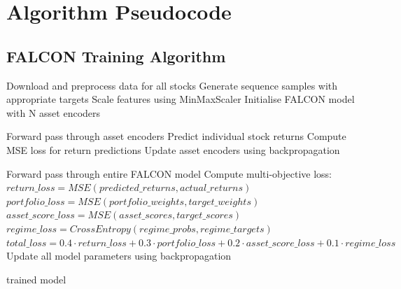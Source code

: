 \documentclass[conference]{IEEEtran}
\begin{document}
\section{Algorithm Pseudocode}

\subsection{FALCON Training Algorithm}
\begin{algorithmic}[1]
\State Download and preprocess data for all stocks
\State Generate sequence samples with appropriate targets
\State Scale features using MinMaxScaler
\State Initialise FALCON model with N asset encoders

        \State Forward pass through asset encoders
        \State Predict individual stock returns
        \State Compute MSE loss for return predictions
        \State Update asset encoders using backpropagation
    \EndFor
\EndFor

        \State Forward pass through entire FALCON model
        \State Compute multi-objective loss:
        \State $return\_loss = MSE(predicted\_returns, actual\_returns)$
        \State $portfolio\_loss = MSE(portfolio\_weights, target\_weights)$
        \State $asset\_score\_loss = MSE(asset\_scores, target\_scores)$
        \State $regime\_loss = CrossEntropy(regime\_probs, regime\_targets)$
        \State $total\_loss = 0.4 \cdot return\_loss + 0.3 \cdot portfolio\_loss + 0.2 \cdot asset\_score\_loss + 0.1 \cdot regime\_loss$
        \State Update all model parameters using backpropagation
    \EndFor
\EndFor

\State \Return trained model
\EndProcedure
\end{algorithmic}
\end{document}
